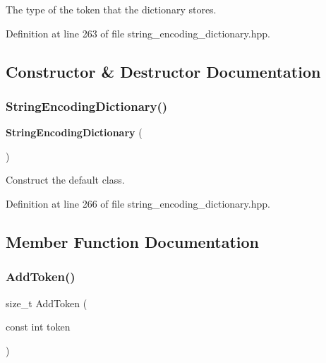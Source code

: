 The type of the token that the dictionary stores. 



Definition at line 263 of file string\+\_\+encoding\+\_\+dictionary.\+hpp.



\subsection{Constructor \& Destructor Documentation}
\mbox{\label{classmlpack_1_1data_1_1StringEncodingDictionary_3_01int_01_4_a8a0f7e3d7c140938e9ead7a43299780d}} 
\subsubsection{String\+Encoding\+Dictionary()}
{\footnotesize\ttfamily \textbf{ String\+Encoding\+Dictionary} (\begin{DoxyParamCaption}{ }\end{DoxyParamCaption})\hspace{0.3cm}{\ttfamily [inline]}}



Construct the default class. 



Definition at line 266 of file string\+\_\+encoding\+\_\+dictionary.\+hpp.



\subsection{Member Function Documentation}
\mbox{\label{classmlpack_1_1data_1_1StringEncodingDictionary_3_01int_01_4_ac1de91f99ae7ca79b333950c0d96b6aa}} 
\subsubsection{Add\+Token()}
{\footnotesize\ttfamily size\+\_\+t Add\+Token (\begin{DoxyParamCaption}\item[{const int}]{token }\end{DoxyParamCaption})\hspace{0.3cm}{\ttfamily [inline]}}



